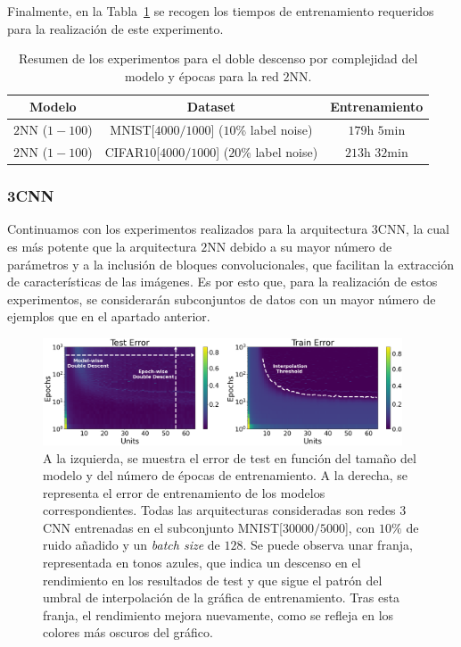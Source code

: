 Finalmente, en la Tabla~\ref{tab:2nn_model-epochwise} se recogen los tiempos de entrenamiento requeridos para la realización de este experimento.

\begin{table}[h!]
    \centering
    \begin{tabular}{|c|c|c|}
    \hline
    \textbf{Modelo}       & \textbf{Dataset} & \textbf{Entrenamiento} \\ 
    \hline
    $2$NN ($1-100$)      & MNIST[$4000/1000$] ($10$\% label noise)        & $179$h $5$min \\ 
    $2$NN ($1-100$)      & CIFAR$10$[$4000/1000$]  ($20$\% label noise)   & $213$h $32$min \\
    \hline
    \end{tabular}
    \caption[Resumen de los experimentos para el doble descenso por complejidad del modelo y épocas para la red $2$NN.]{Resumen de los experimentos para el doble descenso por complejidad del modelo y épocas para la red $2$NN.}\label{tab:2nn_model-epochwise}
\end{table}

\subsubsection{3CNN}\label{subsubsec:model-epoch-wise-3CNN}

Continuamos con los experimentos realizados para la arquitectura $3$CNN, la cual es más potente que la arquitectura $2$NN debido a su mayor número de parámetros y a la inclusión de bloques convolucionales, que facilitan la extracción de características de las imágenes. Es por esto que, para la realización de estos experimentos, se considerarán subconjuntos de datos con un mayor número de ejemplos que en el apartado anterior.

\begin{figure}[h]
    \centering
    \includegraphics[width=0.95\textwidth]{img/experiments/model-epoch3CNNMNIST30k.png}
    \caption[Doble descenso en función del tamaño del modelo y del número de épocas para la red $3$CNN y un subconjunto de MNIST.]{A la izquierda, se muestra el error de test en función del tamaño del modelo y del número de épocas de entrenamiento. A la derecha, se representa el error de entrenamiento de los modelos correspondientes. Todas las arquitecturas consideradas son redes $3$CNN entrenadas en el subconjunto MNIST[$30000/5000$], con $10\%$ de ruido añadido y un \textit{batch size} de $128$. Se puede observa unar franja, representada en tonos azules, que indica un descenso en el rendimiento en los resultados de test y que sigue el patrón del umbral de interpolación de la gráfica de entrenamiento. Tras esta franja, el rendimiento mejora nuevamente, como se refleja en los colores más oscuros del gráfico.
}\label{fig:model-epoch3CNNMNIST30k}
\end{figure}

